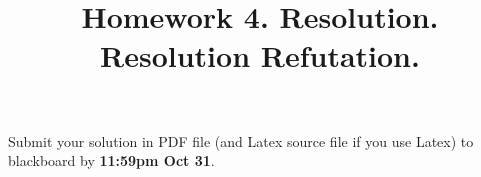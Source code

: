 \documentclass[12pt, letterpaper]{article}
\date{}
\newcommand{\duedate}{
  11:59pm Oct 31}
\begin{document}
\newcommand{\hide}[1]{}
\newcommand{\set}[1]{\{#1\}}
\newcommand{\pg}[1]{{\tt #1}}
\newtheorem{definition}{Definition}
\newcommand{\emptyclause}{\Box}



\title{{\bf Homework 4}. Resolution. Resolution Refutation.}

\date{}
\maketitle



\noindent 
 Submit your solution in PDF file (and Latex source  file if you use Latex) to blackboard by 
 {\bf \duedate}. 
\end{document}
